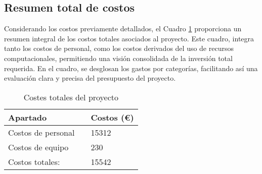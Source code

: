 \subsection{Resumen total de costos}

Considerando los costos previamente detallados, el Cuadro \ref{tabla_costes_total} proporciona un resumen integral de los costos totales asociados al proyecto. Este cuadro, integra tanto los costos de personal, como los costos derivados del uso de recursos computacionales, permitiendo una visión consolidada de la inversión total requerida. En el cuadro, se desglosan los gastos por categorías, facilitando así una evaluación clara y precisa del presupuesto del proyecto.

\begin{table}[H]
	\centering
	\begin{tabular}{|lll|}
		\hline
		Apartado 	 &\vline  & Costos (€) \\
		\hline
		
		Costos de personal    & \vline & 15312 \\			
		\hline
		Costos de equipo  	 & \vline & 230	\\

		\hline
		\hline
		Costos totales:				& \vline & 15542 \\
		\hline
	\end{tabular}
	\caption{Costes totales del proyecto}
	\label{tabla_costes_total}
\end{table}

